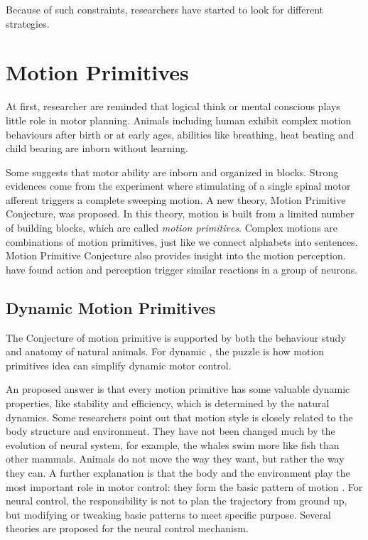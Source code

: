 Because of such constraints, researchers have started to look for different strategies.

\section{Motion Primitives}
At first, researcher are reminded that logical think or mental conscious plays little role in motor planning.
Animals including human exhibit complex motion behaviours after birth or at early ages, abilities like breathing, heat beating and child bearing are inborn without learning.

Some suggests that motor ability are inborn and organized in blocks\citep{bizzi1995modular,bizzi2002book}.
Strong evidences come from the experiment where stimulating of a single spinal motor afferent triggers a complete sweeping motion\citep{bizzi1995modular}.
A new theory, Motion Primitive Conjecture, was proposed.
In this theory, motion is  built from a limited number of building blocks, which are called \emph{motion primitives}.
Complex motions are combinations of motion primitives, just like we connect alphabets into sentences.
Motion Primitive Conjecture also provides insight into the motion perception.
\citet{gallese1996action} have found action and perception trigger similar reactions in a group of neurons.





\subsection{Dynamic Motion Primitives}
The Conjecture of motion primitive is supported by both the behaviour study and anatomy of natural animals.
For dynamic \cms, the puzzle is how motion primitives idea can simplify dynamic motor control.

An proposed answer is that every motion primitive has some valuable dynamic properties, like stability and efficiency, which is determined by the natural dynamics.
Some researchers point out that motion style is closely related to the body structure and environment.
They have not been changed much by the evolution of neural system, for example, the whales swim more like fish than other mammals.
Animals do not move the way they want, but rather the way they can. 
A further explanation is that the body and the environment play the most important role in motor control: they form the basic pattern of motion \citep{nishikawa2007neuromechanics}.
For neural control, the responsibility is not to plan the trajectory from ground up, but modifying or tweaking basic patterns to meet specific purpose.
Several theories are proposed for the neural control mechanism.

